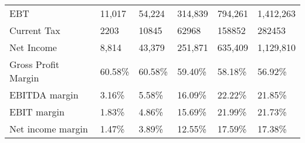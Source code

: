 \begin{tabular}{llllll}
 EBT                      & 11,017  & 54,224    & 314,839   & 794,261   & 1,412,263 \\
 Current Tax              & 2203    & 10845     & 62968     & 158852    & 282453    \\
 Net Income               & 8,814   & 43,379    & 251,871   & 635,409   & 1,129,810 \\
 Gross Profit Margin      & 60.58\%  & 60.58\%    & 59.40\%    & 58.18\%    & 56.92\%    \\
 EBITDA margin            & 3.16\%   & 5.58\%     & 16.09\%    & 22.22\%    & 21.85\%    \\
 EBIT margin              & 1.83\%   & 4.86\%     & 15.69\%    & 21.99\%    & 21.73\%    \\
 Net income margin        & 1.47\%   & 3.89\%     & 12.55\%    & 17.59\%    & 17.38\%    \\
\hline
\end{tabular}